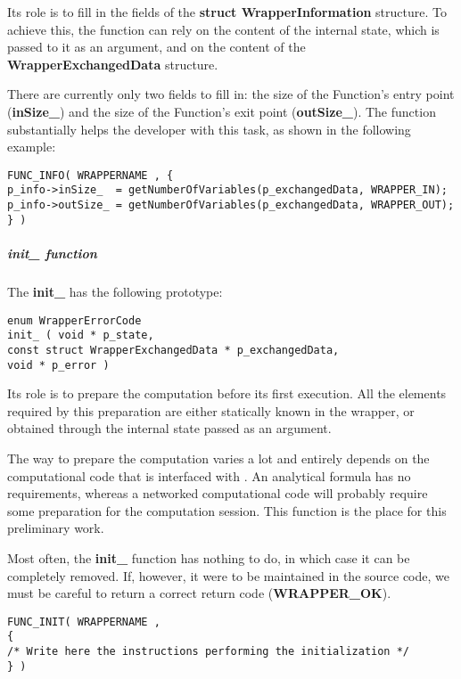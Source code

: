 Its role is to fill in the fields of the {\bf struct WrapperInformation} structure. To achieve this, the function can rely on the content of the internal state, which is passed to it as an argument, and on the content of the {\bf WrapperExchangedData} structure.

There are currently only two fields to fill in: the size of the Function's entry point ({\bf inSize\_}) and the size of the Function's exit point ({\bf outSize\_}). The  function substantially helps the developer with this task, as shown in the following example:

\lstset{language=C++, basicstyle=\normalsize}
\begin{lstlisting}[frame=TBRL]
FUNC_INFO( WRAPPERNAME , {
p_info->inSize_  = getNumberOfVariables(p_exchangedData, WRAPPER_IN);
p_info->outSize_ = getNumberOfVariables(p_exchangedData, WRAPPER_OUT);
} )
\end{lstlisting}


\subparagraph{init\_ function}

The {\bf init\_} has the following prototype:

\lstset{language=C++, basicstyle=\normalsize}
\begin{lstlisting}[frame=TBRL]
enum WrapperErrorCode
init_ ( void * p_state,
const struct WrapperExchangedData * p_exchangedData,
void * p_error )
\end{lstlisting}

Its role is to prepare the computation before its first execution. All the elements required by this preparation are either statically known in the wrapper, or obtained through the internal state passed as an argument.

The way to prepare the computation varies a lot and entirely depends on the computational code that is interfaced with \OT . An analytical formula has no requirements, whereas a networked computational code will probably require some preparation for the computation session. This function is the place for this preliminary work.

Most often, the {\bf init\_} function has nothing to do, in which case it can be completely removed. If, however, it were to be maintained in the source code, we must be careful to return a correct return code ({\bf WRAPPER\_OK}).

\lstset{language=C++, basicstyle=\normalsize}
\begin{lstlisting}[frame=TBRL]
FUNC_INIT( WRAPPERNAME ,
{
/* Write here the instructions performing the initialization */
} )
\end{lstlisting}


